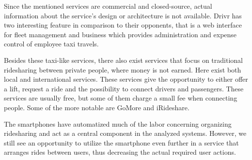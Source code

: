 Since the mentioned services are commercial and closed-source, actual information about the service's design or architecture is not available.
Drivr has two interesting feature in comparison to their opponents, that is a web interface for fleet management and business which provides administration and expense control of employee taxi travels.

Besides these taxi-like services, there also exist services that focus on traditional ridesharing between private people, where money is not earned.
Here exist both local and international services. 
These services give the opportunity to either offer a lift, request a ride and the possibility to connect drivers and passengers.
These services are usually free, but some of them charge a small fee when connecting people.
Some of the more notable are GoMore and iRideshare.

The smartphones have automatized much of the labor concerning organizing ridesharing and act as a central component in the analyzed systems.
However, we still see an opportunity to utilize the smartphone even further in a service that arranges rides between users, thus decreasing the actual required user actions.
